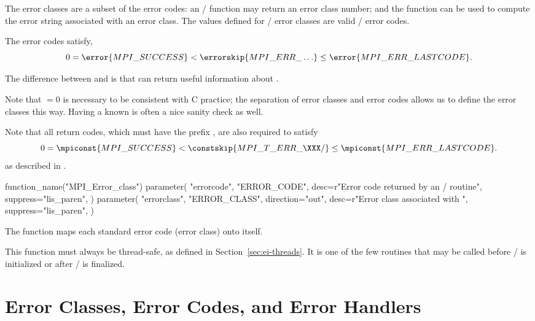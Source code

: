The error classes are a subset of the error codes: an \MPI/ function
may return an error class number; and the function
 can be used to compute the error string
associated with an error class.
The values
defined for \MPI/ error classes are valid \MPI/ error codes.

The error codes satisfy,
$$
0 = \error{MPI\_SUCCESS} < \errorskip{MPI\_ERR\_\ldots} \leq \error{MPI\_ERR\_LASTCODE}.
$$

\begin{rationale}
The difference between  and  is
that 
can return useful information about
.

Note that  $= 0$ is necessary to be
consistent with C practice; the separation of error classes and error codes
allows us to define the error classes this way.  Having a known
 is often a nice sanity check as well.
\end{rationale}

\begin{implementors}
Note that all  return codes, which must have the prefix , are also required to satisfy
$$
0 = \mpiconst{MPI\_SUCCESS} < \constskip{MPI\_T\_ERR\_\XXX/} \leq \mpiconst{MPI\_ERR\_LASTCODE}.
$$
as described in .
\end{implementors}

\begin{mpi-binding}
    function_name("MPI_Error_class")
    parameter(
        "errorcode",
        "ERROR_CODE",
        desc=r"Error code returned by an \MPI/ routine",
        suppress="lis_paren",
    )
    parameter(
        "errorclass",
        "ERROR_CLASS",
        direction="out",
        desc=r"Error class associated with ",
        suppress="lis_paren",
    )
\end{mpi-binding}

The function  maps each standard error code (error
class) onto itself.

This function must always be thread-safe, as defined in
Section~\ref{sec:ei-threads}.
It is one of the few routines that may be called before
\MPI/ is initialized or after \MPI/ is finalized.

\section{Error Classes, Error Codes, and Error Handlers} 
\label{sec:ei-error}

